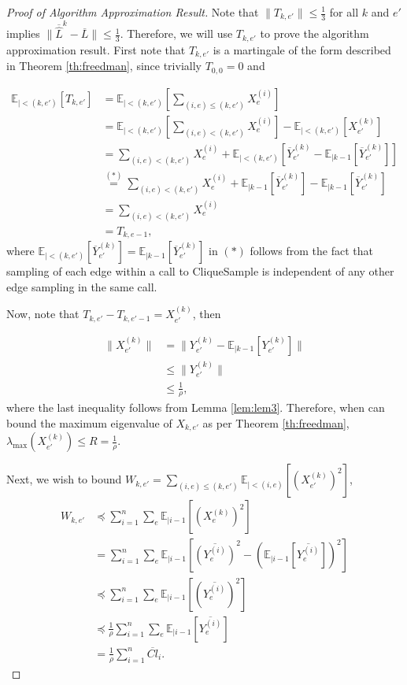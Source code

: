 \documentclass[11pt]{article}
\newcommand{\CExp}[1]{\mathbb{E}_{|#1}}
\begin{document}
\begin{proof}[Proof of Algorithm Approximation Result]
Note that $ \lVert T_{k,e'} \rVert \leq \frac{1}{3} $ for all $ k $ and $ e' $ implies $ \lVert \overline{\widehat{L}}^{k} - \overline{L} \rVert \leq \frac{1}{3} $. Therefore, we will use $ T_{k,e'} $ to prove the algorithm approximation result. First note that $ T_{k,e'} $ is a martingale of the form described in Theorem \ref{th:freedman}, since trivially $ T_{0,0} = 0 $ and 

\begin{align*}
\CExp{<(k,e')}[T_{k,e'}] &= \CExp{<(k,e')}\left[\sum_{(i,e) \leq (k,e')}X_{e}^{(i)}\right] \\
&= \CExp{<(k,e')}\left[\sum_{(i,e) < (k,e')}X_{e}^{(i)}\right] - \CExp{<(k,e')}\left[X_{e'}^{(k)}\right] \\
&= \sum_{(i,e) < (k,e')}X_{e}^{(i)} + \CExp{<(k,e')}\left[\overline{Y}_{e'}^{(k)} - \CExp{k-1}\left[\overline{Y}_{e'}^{(k)}\right]\right] \\ 
&\stackrel{(*)}{=} \sum_{(i,e) < (k,e')}X_{e}^{(i)} + \CExp{k-1}\left[\overline{Y}_{e'}^{(k)}\right] - \CExp{k-1}\left[\overline{Y}_{e'}^{(k)}\right] \\
&= \sum_{(i,e) < (k,e')}X_{e}^{(i)} \\
&= T_{k,e-1},
\end{align*}
where $ \CExp{<(k,e')}\left[\overline{Y}_{e'}^{(k)}\right] = \CExp{k-1}\left[\overline{Y}_{e'}^{(k)}\right] $ in $ (*) $ follows from the fact that sampling of each edge within a call to CliqueSample is independent of any other edge sampling in the same call.

Now, note that $ T_{k,e'} - T_{k,e'-1} = X_{e'}^{(k)} $, then


\begin{align*}
\lVert X_{e'}^{(k)} \rVert &= \lVert Y_{e'}^{(k)} - \CExp{k-1}\left[Y_{e'}^{(k)}\right] \rVert \\
&\leq \lVert Y_{e'}^{(k)} \rVert \\
&\leq \frac{1}{\rho},
\end{align*}
where the last inequality follows from Lemma \ref{lem:lem3}. Therefore, when can bound the maximum eigenvalue of $ X_{k,e'} $ as per Theorem \ref{th:freedman}, $ \lambda_{\text{max}}(X_{e'}^{(k)}) \leq R = \frac{1}{\rho} $.

Next, we wish to bound $ W_{k,e'} = \sum_{(i,e) \leq (k,e')}\CExp{<(i,e)}\left[\left(X_{e'}^{(k)}\right)^{2}\right] $, 
\begin{align*}
W_{k,e'} &\preccurlyeq \sum_{i=1}^{n}\sum_{e}\CExp{i-1}\left[\left(X_{e}^{(k)}\right)^{2}\right] \\
&= \sum_{i=1}^{n}\sum_{e}\CExp{i-1}\left[\overline{(Y_{e}^{(i)})}^{2}-\left(\CExp{i-1}\left[\overline{Y_{e}^{(i)}}\right]\right)^{2}\right] \\
&\preccurlyeq \sum_{i=1}^{n}\sum_{e}\CExp{i-1}\left[(\overline{Y_{e}^{(i)}})^{2}\right] \\
&\preccurlyeq \frac{1}{\rho}\sum_{i=1}^{n}\sum_{e}\CExp{i-1}\left[\overline{Y_{e}^{(i)}}\right] \\
&= \frac{1}{\rho}\sum_{i=1}^{n}\overline{Cl}_{i}.
\end{align*}


\end{proof}
\end{document}
